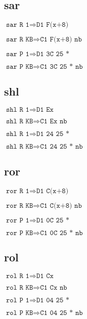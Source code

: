 \documentclass{article}
\begin{document}
\subsection{sar}
\begin{minipage}{\textwidth}

$\texttt{sar R 1} \Rightarrow \texttt{D1 F(x+8)}$

$\texttt{sar R KB} \Rightarrow \texttt{C1 F(x+8) nb}$

$\texttt{sar P 1} \Rightarrow \texttt{D1 3C 25 *}$

$\texttt{sar P KB} \Rightarrow \texttt{C1 3C 25 * nb}$

\end{minipage}


\subsection{shl}
\begin{minipage}{\textwidth}

$\texttt{shl R 1} \Rightarrow \texttt{D1 Ex}$

$\texttt{shl R KB} \Rightarrow \texttt{C1 Ex nb}$

$\texttt{shl R 1} \Rightarrow \texttt{D1 24 25 *}$

$\texttt{shl R KB} \Rightarrow \texttt{C1 24 25 * nb}$

\end{minipage}


\subsection{ror}
\begin{minipage}{\textwidth}

$\texttt{ror R 1} \Rightarrow \texttt{D1 C(x+8)}$

$\texttt{ror R KB} \Rightarrow \texttt{C1 C(x+8) nb}$

$\texttt{ror P 1} \Rightarrow \texttt{D1 0C 25 *}$

$\texttt{ror P KB} \Rightarrow \texttt{C1 0C 25 * nb}$

\end{minipage}


\subsection{rol}
\begin{minipage}{\textwidth}

$\texttt{rol R 1} \Rightarrow \texttt{D1 Cx}$

$\texttt{rol R KB} \Rightarrow \texttt{C1 Cx nb}$

$\texttt{rol P 1} \Rightarrow \texttt{D1 04 25 *}$

$\texttt{rol P KB} \Rightarrow \texttt{C1 04 25 * nb}$

\end{minipage}
\end{document}
